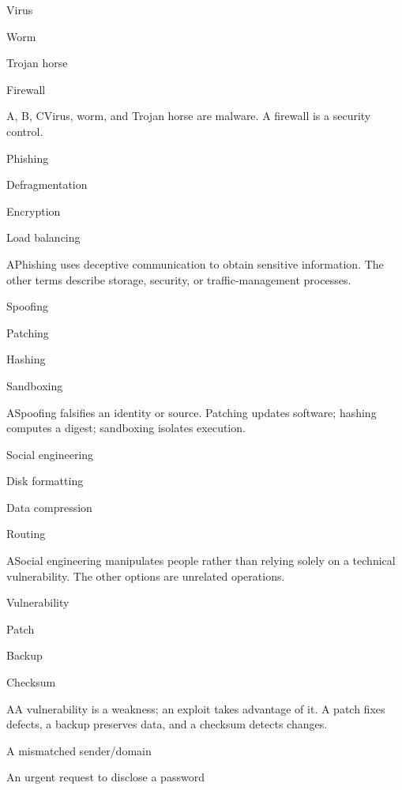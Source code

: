 \begin{enumerate}[label=\textbf{Q\arabic*.}, leftmargin=*]
  {\item Virus
   \item Worm
   \item Trojan horse
   \item Firewall}
  {A, B, C}{Virus, worm, and Trojan horse are malware. A firewall is a security control.}
\fi
\ifnum{}
  {\item Phishing
   \item Defragmentation
   \item Encryption
   \item Load balancing}
  {A}{Phishing uses deceptive communication to obtain sensitive information. The other terms describe storage, security, or traffic-management processes.}
  {\item Spoofing
   \item Patching
   \item Hashing
   \item Sandboxing}
  {A}{Spoofing falsifies an identity or source. Patching updates software; hashing computes a digest; sandboxing isolates execution.}
  {\item Social engineering
   \item Disk formatting
   \item Data compression
   \item Routing}
  {A}{Social engineering manipulates people rather than relying solely on a technical vulnerability. The other options are unrelated operations.}
  {\item Vulnerability
   \item Patch
   \item Backup
   \item Checksum}
  {A}{A vulnerability is a weakness; an exploit takes advantage of it. A patch fixes defects, a backup preserves data, and a checksum detects changes.}
  {\item A mismatched sender/domain
   \item An urgent request to disclose a password
}
\end{enumerate}
